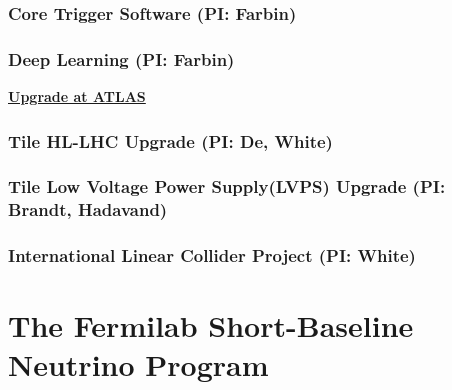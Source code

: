 \documentclass[11pt]{article}
\def\onehead#1{\part{#1}}
\def\twohead#1{\section{#1}}
\begin{document}

\twohead{Core Trigger Software (PI: Farbin)}

\twohead{Deep Learning (PI: Farbin)}


\begin{center}
\underline{\textbf{\huge Upgrade at ATLAS}}
\end{center}

\twohead{Tile HL-LHC Upgrade (PI: De, White)}

\twohead{Tile Low Voltage Power Supply(LVPS) Upgrade  (PI: Brandt, Hadavand)}
\label{sec:Tile-HL-LHC}



\twohead{International Linear Collider Project (PI: White)}









\newpage





%

%

\onehead{The Fermilab Short-Baseline Neutrino Program}

\end{document}
